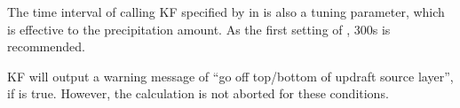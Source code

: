 The time interval of calling KF specified by  in  is also a tuning parameter, which is effective to the precipitation amount. As the first setting of , 300s is recommended.

KF will output a warning message of ``go off top/bottom of updraft source layer'', if  is true.
However, the calculation is not aborted for these conditions.

